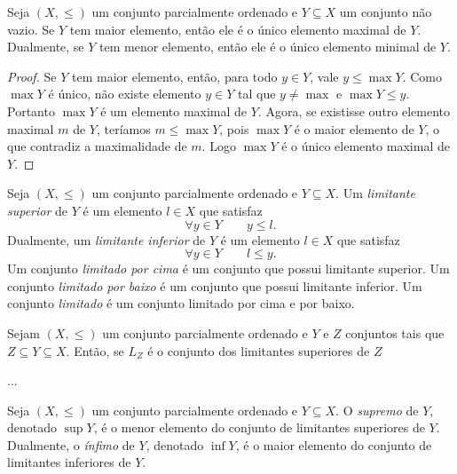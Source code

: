 \begin{prop}
	Seja $(X,\leq)$ um conjunto parcialmente ordenado e $Y \subseteq X$ um conjunto não vazio. Se $Y$ tem maior elemento, então ele é o único elemento maximal de $Y$. Dualmente, se $Y$ tem menor elemento, então ele é o único elemento minimal de $Y$.
\end{prop}
\begin{proof}
	Se $Y$ tem maior elemento, então, para todo $y \in Y$, vale $y \leq \max Y$. Como $\max Y$ é único, não existe elemento $y \in Y$ tal que $y \neq \max$ e $\max Y \leq y$. Portanto $\max Y$ é um elemento maximal de $Y$. Agora, se existisse outro elemento maximal $m$ de $Y$, teríamos $m \leq \max Y$, pois $\max Y$ é o maior elemento de $Y$, o que contradiz a maximalidade de $m$. Logo $\max Y$ é o único elemento maximal de $Y$.
\end{proof}

\begin{defi}
	Seja $(X,\leq)$ um conjunto parcialmente ordenado e $Y \subseteq X$. Um \emph{limitante superior} de $Y$ é um elemento $l \in X$ que satisfaz
	\begin{equation*}
	\forall y \in Y \qquad y \leq l.
	\end{equation*}
Dualmente, um \emph{limitante inferior} de $Y$ é um elemento $l \in X$ que satisfaz
	\begin{equation*}
	\forall y \in Y \qquad l \leq y.
	\end{equation*}
Um conjunto \emph{limitado por cima} é um  conjunto que possui limitante superior. Um conjunto \emph{limitado por baixo} é um conjunto que possui limitante inferior. Um conjunto \emph{limitado} é um conjunto limitado por cima e por baixo.
\end{defi}

\begin{prop}
	Sejam $(X,\leq)$ um conjunto parcialmente ordenado e $Y$ e $Z$ conjuntos tais que $Z \subseteq Y \subseteq X$. Então, se $L_Z$ é o conjunto dos limitantes superiores de $Z$
	
	...
\end{prop}

\begin{defi}
	Seja $(X,\leq)$ um conjunto parcialmente ordenado e $Y \subseteq X$. O \emph{supremo} de $Y$, denotado $\sup Y$, é o menor elemento do conjunto de limitantes superiores de $Y$. Dualmente, o \emph{ínfimo} de $Y$, denotado $\inf Y$, é o maior elemento do conjunto de limitantes inferiores de $Y$.
\end{defi}

